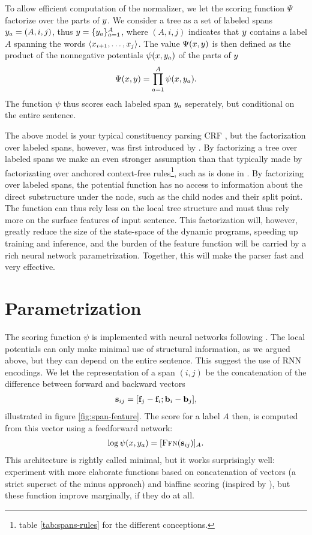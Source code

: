 To allow efficient computation of the normalizer, we let the scoring function $\Psi$ factorize over the parts of $y$. We consider a tree as a set of labeled spans $y_a = (A, i, j)$, thus $y = \{ y_a \}_{a=1}^A$, where $(A, i, j)$ indicates that $y$ contains a label $A$ spanning the words $\langle x_{i+1}, \dots, x_j \rangle$. The value $\Psi(x, y)$ is then defined as the product of the nonnegative potentials $\psi(x, y_a)$ of the parts of $y$
\begin{align}
  \Psi(x, y) = \prod_{a=1}^A \psi(x, y_a).
\end{align}
The function $\psi$ thus scores each labeled span $y_a$ seperately, but conditional on the entire sentence.

The above model is your typical constituency parsing CRF \citep{finkel2008crf,klein2015crf}, but the factorization over labeled spans, however, was first introduced by \citet{stern2017minimal}. By factorizing a tree over labeled spans we make an even stronger assumption than that typically made by factorizating over anchored context-free rules\footnote{\cf table \ref{tab:spans-rules} for the different conceptions.}, such as is done in \citet{finkel2008crf,klein2015crf}. By factorizing over labeled spans, the potential function has no access to information about the direct substructure under the node, such as the child nodes and their split point. The function can thus rely less on the local tree structure and must thus rely more on the surface features of input sentence. This factorization will, however, greatly reduce the size of the state-space of the dynamic programs, speeding up training and inference, and the burden of the feature function will be carried by a rich neural network parametrization. Together, this will make the parser fast and very effective.

\section{Parametrization}
The scoring function $\psi$ is implemented with neural networks following \citet{stern2017minimal}. The local potentials can only make minimal use of structural information, as we argued above, but they can depend on the entire sentence. This suggest the use of RNN encodings. We let the representation of a span $(i, j)$ be the concatenation of the difference between forward and backward vectors
\begin{align}
  \label{eq:span-feature}
  \mathbf{s}_{ij} = [\mathbf{f}_j - \mathbf{f}_i; \mathbf{b}_i - \mathbf{b}_j],
\end{align}
illustrated in figure \ref{fig:span-feature}. The score for a label $A$ then, is computed from this vector using a feedforward network:
\begin{align}
  \label{eq:potential-function}
  \log \psi(x, y_a) = [ \textsc{Ffn}( \mathbf{s}_{ij} ) ]_{A}.
\end{align}
This architecture is rightly called minimal, but it works surprisingly well: \citet{stern2017minimal} experiment with more elaborate functions based on concatenation of vectors (a strict superset of the minus approach) and biaffine scoring (inspired by \citep{dozat2016deep}), but these function improve marginally, if they do at all.

